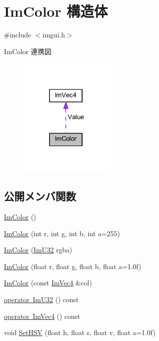 \hypertarget{struct_im_color}{}\section{Im\+Color 構造体}
\label{struct_im_color}


{\ttfamily \#include $<$imgui.\+h$>$}



Im\+Color 連携図\nopagebreak
\begin{figure}[H]
\begin{center}
\leavevmode
\includegraphics[width=133pt]{struct_im_color__coll__graph}
\end{center}
\end{figure}
\subsection*{公開メンバ関数}
\begin{DoxyCompactItemize}
\item 
\mbox{\hyperlink{struct_im_color_a95206b688dcc03f725790538c74f4526}{Im\+Color}} ()
\item 
\mbox{\hyperlink{struct_im_color_ab4ba02f8290d5dadc1ebc57b2c8a9cbe}{Im\+Color}} (int r, int g, int b, int a=255)
\item 
\mbox{\hyperlink{struct_im_color_ad306332841a2b1f903f40262a19f9412}{Im\+Color}} (\mbox{\hyperlink{imgui_8h_a118cff4eeb8d00e7d07ce3d6460eed36}{Im\+U32}} rgba)
\item 
\mbox{\hyperlink{struct_im_color_a92b53917ca9d90a7207b18270ff5453d}{Im\+Color}} (float r, float g, float b, float a=1.\+0f)
\item 
\mbox{\hyperlink{struct_im_color_aa5306926b3ef766a8647b26bdfd9f8d2}{Im\+Color}} (const \mbox{\hyperlink{struct_im_vec4}{Im\+Vec4}} \&col)
\item 
\mbox{\hyperlink{struct_im_color_a4f4fc53e0676d50404d6d5ffcf16637f}{operator Im\+U32}} () const
\item 
\mbox{\hyperlink{struct_im_color_a10f1de242f13c93f8be64545e4cbcb0a}{operator Im\+Vec4}} () const
\item 
void \mbox{\hyperlink{struct_im_color_afcff20160db703b956d56e5a9fa88e24}{Set\+H\+SV}} (float h, float s, float v, float a=1.\+0f)
\end{DoxyCompactItemize}

